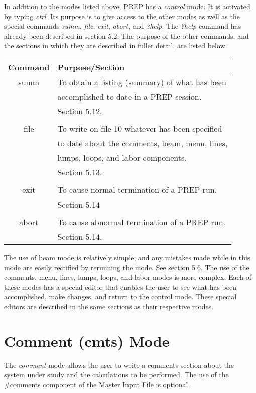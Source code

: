In addition to the modes listed above, PREP has a {\em control} mode. It is
activated by typing {\em ctrl}. Its purpose is to give access to the other
modes as well as the special commands {\em summ}, {\em file}, {\em exit},
{\em abort}, and {\em ?help}. The {\em ?help} command has already been
described in section 5.2. The purpose of the other commands, and the
sections in which they are described in fuller detail, are listed below.

\begin{center}
\begin{tabular}{|c|l|} \hline Command & Purpose/Section \\ \hline summ & To
obtain a listing (summary) of what has been \\ & accomplished to date in a
PREP session. \\ & Section 5.12. \\ & \\ file & To write on file 10
whatever has been specified \\ & to date about the comments, beam, menu,
lines, \\ & lumps, loops, and labor components. \\ & Section 5.13. \\ & \\
exit & To cause normal termination of a PREP run. \\ & Section 5.14 \\ & \\
abort & To cause abnormal termination of a PREP run. \\ & Section 5.14. \\
\hline
\end{tabular}
\end{center}

The use of beam mode is relatively simple, and any mistakes made while in
this mode are easily rectified by rerunning the mode. See section 5.6. The
use of the comments, menu, lines, lumps, loops, and labor modes is more
complex. Each of these modes has a special editor that enables the user to
see what has been accomplished, make changes, and return to the control
mode. These special editors are described in the same sections as their
respective modes.

\section{Comment (cmts) Mode} The {\em comment} mode allows the user to
write a comments section about the system under study and the calculations
to be performed. The use of the \#comments component of the Master Input
File is optional.

